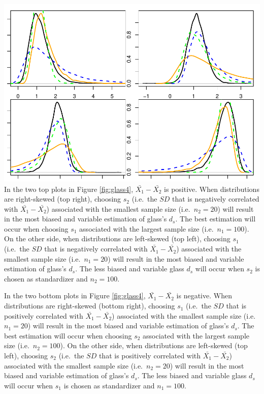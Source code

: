 \documentclass[
  man,floatsintext]{apa6}
\begin{document}
\includegraphics{Mathematical-study-of-Glass-s-d_files/figure-latex/glass4-1.pdf}
In the two top plots in Figure \ref{fig:glass4}, \(\bar{X_1}-\bar{X_2}\) is positive. When distributions are right-skewed (top right), choosing \(s_2\) (i.e.~the \(SD\) that is negatively correlated with \(\bar{X_1}-\bar{X_2}\)) associated with the smallest sample size (i.e.~\(n_2=20\)) will result in the most biased and variable estimation of glass's \(d_s\). The best estimation will occur when choosing \(s_1\) associated with the largest sample size (i.e.~\(n_1=100\)). On the other side, when distributions are left-skewed (top left), choosing \(s_1\) (i.e.~the \(SD\) that is negatively correlated with \(\bar{X_1}-\bar{X_2}\)) associated with the smallest sample size (i.e.~\(n_1=20\)) will result in the most biased and variable estimation of glass's \(d_s\). The less biased and variable glass \(d_s\) will occur when \(s_2\) is chosen as standardizer and \(n_2=100\).

In the two bottom plots in Figure \ref{fig:glass4}, \(\bar{X_1}-\bar{X_2}\) is negative. When distributions are right-skewed (bottom right), choosing \(s_1\) (i.e.~the \(SD\) that is positively correlated with \(\bar{X_1}-\bar{X_2}\)) associated with the smallest sample size (i.e.~\(n_1=20\)) will result in the most biased and variable estimation of glass's \(d_s\). The best estimation will occur when choosing \(s_2\) associated with the largest sample size (i.e.~\(n_2=100\)). On the other side, when distributions are left-skewed (top left), choosing \(s_2\) (i.e.~the \(SD\) that is positively correlated with \(\bar{X_1}-\bar{X_2}\)) associated with the smallest sample size (i.e.~\(n_2=20\)) will result in the most biased and variable estimation of glass's \(d_s\). The less biased and variable glass \(d_s\) will occur when \(s_1\) is chosen as standardizer and \(n_1=100\).
\end{document}
